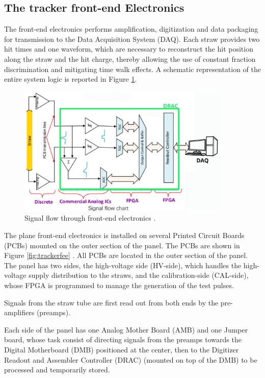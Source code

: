 \subsection{The tracker front-end Electronics}\label{tfee}
The front-end electronics performs amplification, digitization and data packaging 
for transmission to the Data Acquisition System (DAQ). Each straw provides two hit times and one waveform, 
which are necessary to reconstruct the hit position along the straw and the hit charge, 
thereby allowing the use of constant fraction discrimination and mitigating time walk effects. 
A schematic representation of the entire system logic is reported in Figure \ref{fig:flowfee}.
\begin{figure}[!h]
    \centering
    \includegraphics[width =0.9\textwidth]{figures/png/Screenshot_20240529_133230.png}
    \caption[Signal flow through front-end electronics.]{Signal flow through front-end electronics \cite{bartoszek2015mu2e}.}
    \label{fig:flowfee}
    \end{figure}
The plane front-end electronics is installed on several Printed Circuit Boards 
(PCBs) mounted on the outer section of the panel. 
The PCBs are shown in Figure \ref{fig:trackerfee} \cite{vadimmu2e}.
All PCBs are located in the outer section of the panel. 
The panel has two sides, the high-voltage side (HV-side), 
which handles the high-voltage supply distribution to the straws, and 
the calibration-side (CAL-side), whose FPGA is programmed 
to manage the generation of the test pulses.

Signals from the straw tube are first read 
out from both ends by the pre-amplifiers (preamps).

Each side of the panel has one Analog Mother Board (AMB) and one Jumper board, 
whose task consist of directing signals from the preamps towards the Digital 
Motherboard (DMB) positioned at the center, then to the Digitizer Readout and 
Assembler Controller (DRAC) (mounted on top of the DMB) to be processed and 
temporarily stored. 


